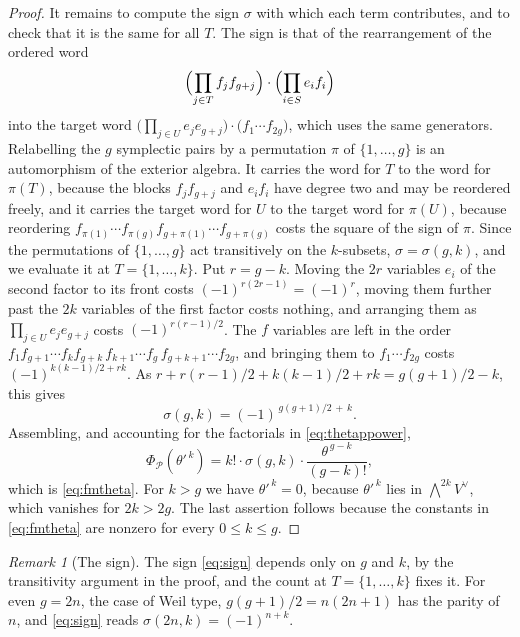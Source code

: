 \documentclass[11pt,reqno]{amsart}
\theoremstyle{plain}
\theoremstyle{definition}
\theoremstyle{remark}
\newtheorem{remark}[theorem]{Remark}
\newcommand{\cP}{\mathcal{P}}
\begin{document}
\begin{proof}
It remains to compute the sign $\sigma$ with which each term contributes, and
to check that it is the same for all $T$. The sign is that of the
rearrangement of the ordered word
\[
  \Bigl(\prod_{j\in T}f_{j}f_{g+j}\Bigr)\cdot\Bigl(\prod_{i\in S}e_{i}f_{i}\Bigr)
\]
into the target word
$\bigl(\prod_{j\in U}e_{j}e_{g+j}\bigr)\cdot\bigl(f_{1}\cdots f_{2g}\bigr)$,
which uses the same generators. Relabelling the $g$ symplectic pairs by a
permutation $\pi$ of $\{1,\dots,g\}$ is an automorphism of the exterior
algebra. It
carries the word for $T$ to the word for $\pi(T)$, because the blocks
$f_{j}f_{g+j}$ and $e_{i}f_{i}$ have degree two and may be reordered freely,
and it carries the target word for $U$ to the target word for $\pi(U)$,
because reordering
$f_{\pi(1)}\cdots f_{\pi(g)}f_{g+\pi(1)}\cdots f_{g+\pi(g)}$ costs the
square of the sign of $\pi$. Since the permutations of $\{1,\dots,g\}$ act
transitively on the $k$-subsets, $\sigma=\sigma(g,k)$, and we evaluate it at
$T=\{1,\dots,k\}$. Put $r=g-k$. Moving the $2r$ variables $e_{i}$ of the
second factor to its front costs $(-1)^{r(2r-1)}=(-1)^{r}$, moving them
further past the $2k$ variables of the first factor costs nothing, and
arranging them as $\prod_{j\in U}e_{j}e_{g+j}$ costs $(-1)^{r(r-1)/2}$. The
$f$ variables are left in the order
$f_{1}f_{g+1}\cdots f_{k}f_{g+k}\,f_{k+1}\cdots f_{g}\,f_{g+k+1}\cdots f_{2g}$,
and bringing them to $f_{1}\cdots f_{2g}$ costs $(-1)^{k(k-1)/2+rk}$. As
$r+r(r-1)/2+k(k-1)/2+rk=g(g+1)/2-k$, this gives
\begin{equation}\label{eq:sign}
  \sigma(g,k)=(-1)^{\,g(g+1)/2\,+\,k}.
\end{equation}
Assembling, and accounting for the factorials in \eqref{eq:thetappower},
\[
  \Phi_{\cP}(\theta'^{\,k})
  =k!\cdot\sigma(g,k)\cdot\frac{\theta^{\,g-k}}{(g-k)!},
\]
which is \eqref{eq:fmtheta}. For $k>g$ we have $\theta'^{\,k}=0$, because
$\theta'^{\,k}$ lies in $\bigwedge^{2k}V^{\vee}$, which vanishes for
$2k>2g$. The last assertion follows because the constants in
\eqref{eq:fmtheta} are nonzero for every $0\le k\le g$.
\end{proof}

\begin{remark}[The sign]\label{rem:signcheck}
The sign \eqref{eq:sign} depends only on $g$ and $k$, by the transitivity
argument in the proof, and the count at $T=\{1,\dots,k\}$ fixes it. For even $g=2n$, the case of Weil type,
$g(g+1)/2=n(2n+1)$ has the parity of $n$, and \eqref{eq:sign} reads
$\sigma(2n,k)=(-1)^{n+k}$.
\end{remark}
\end{document}
